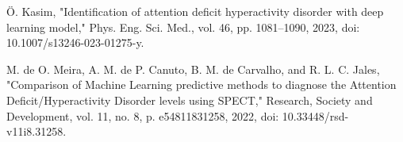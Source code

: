 \documentclass[12pt]{article}
\begin{document}
\begin{thebibliography}{99}
 Ö. Kasim, "Identification of attention deficit hyperactivity disorder with deep learning model," Phys. Eng. Sci. Med., vol. 46, pp. 1081–1090, 2023, doi: 10.1007/s13246-023-01275-y.

 M. de O. Meira, A. M. de P. Canuto, B. M. de Carvalho, and R. L. C. Jales, "Comparison of Machine Learning predictive methods to diagnose the Attention Deficit/Hyperactivity Disorder levels using SPECT," Research, Society and Development, vol. 11, no. 8, p. e54811831258, 2022, doi: 10.33448/rsd-v11i8.31258.

\end{thebibliography}
\end{document}
